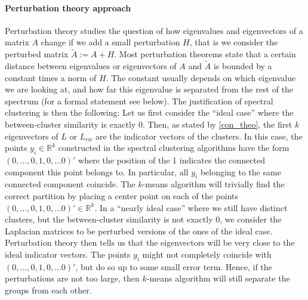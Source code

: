 \documentclass[a4paper,12pt]{article}
\theoremstyle{definition}
\theoremstyle{plain}
\def\R{\mathbb{R}}%
\begin{document}
\paragraph{Perturbation theory approach} 
Perturbation theory studies the question of how eigenvalues and
eigenvectors of a matrix $A$ change if we add a small perturbation
$H$, that is we consider the perturbed matrix $\tilde A := A + H$.
Most perturbation theorems state that a certain distance between
eigenvalues or eigenvectors of $A$ and $\tilde A$ is bounded by a
constant times a norm of $H$. The constant usually depends on which
eigenvalue we are looking at, and how far this eigenvalue is separated
from the rest of
the spectrum (for a formal statement see below). 
%
The justification of spectral clustering is then the following: Let us
first consider the ``ideal case'' where the between-cluster similarity
is exactly 0. Then, as stated by \ref{con_theo}, the first $k$ eigenvectors of $L$ or $L_{rw}$ are the indicator
vectors of the clusters. In this case, the points $y_i \in \R^k$
constructed in the spectral clustering algorithms have the form
$(0,\hdots,0,1,0,\hdots0)'$ where the position of the 1 indicates the
connected component this point belongs to. In particular, all $y_i$
belonging to the same connected component coincide. The $k$-means
algorithm will trivially find the correct partition by placing a
center point on each of the points $(0,\hdots,0,1,0,\hdots0)' \in
\R^k$.
%
In a ``nearly ideal case'' where we still have distinct clusters, but
the between-cluster similarity is not exactly 0, we consider the
Laplacian matrices to be perturbed versions of the ones of the ideal
case. Perturbation theory then tells us that the eigenvectors will be
very close to the ideal indicator vectors. The points $y_i$ might not
completely coincide with $(0,\hdots,0,1,0,\hdots0)'$, but do so up to
some small error term. Hence, if the perturbations are not too large,
then $k$-means algorithm will still separate the groups from each
other. \\
\end{document}
